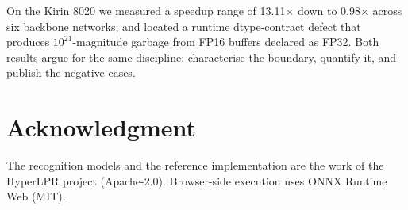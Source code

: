 \documentclass[journal]{IEEEtran}
\begin{document}
On the Kirin 8020 we measured a speedup range of 13.11$\times$ down to
0.98$\times$ across six backbone networks, and located a runtime dtype-contract
defect that produces $10^{21}$-magnitude garbage from FP16 buffers declared as
FP32. Both results argue for the same discipline: characterise the boundary,
quantify it, and publish the negative cases.

\section*{Acknowledgment}

The recognition models and the reference implementation are the work of the
HyperLPR project \cite{hyperlpr} (Apache-2.0). Browser-side execution uses ONNX
Runtime Web \cite{ortweb} (MIT).
\end{document}
